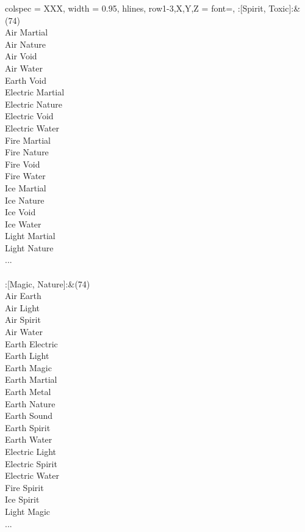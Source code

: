 \begin{longtblr}[
	caption = {2v2 Defending Weak},
	label = {2v2-Defending-Weak},
]{
	colspec = {XXX}, width = 0.95\linewidth,
	hlines,
	row{1-3,X,Y,Z} = {font=\bfseries},
}
	:[Spirit, Toxic]:&{(74)\\
	Air Martial \\
	Air Nature \\
	Air Void \\
	Air Water \\
	Earth Void \\
	Electric Martial \\
	Electric Nature \\
	Electric Void \\
	Electric Water \\
	Fire Martial \\
	Fire Nature \\
	Fire Void \\
	Fire Water \\
	Ice Martial \\
	Ice Nature \\
	Ice Void \\
	Ice Water \\
	Light Martial \\
	Light Nature \\
	...\\
	}\\

	:[Magic, Nature]:&{(74)\\
	Air Earth \\
	Air Light \\
	Air Spirit \\
	Air Water \\
	Earth Electric \\
	Earth Light \\
	Earth Magic \\
	Earth Martial \\
	Earth Metal \\
	Earth Nature \\
	Earth Sound \\
	Earth Spirit \\
	Earth Water \\
	Electric Light \\
	Electric Spirit \\
	Electric Water \\
	Fire Spirit \\
	Ice Spirit \\
	Light Magic \\
	...\\
	}\\


\end{longtblr}
